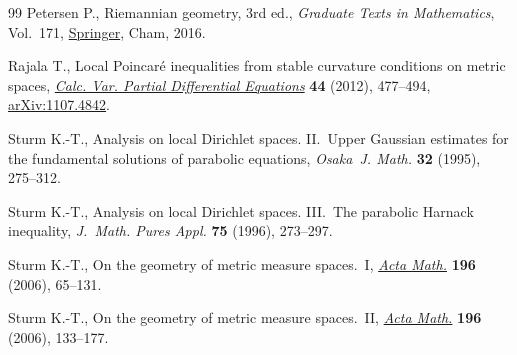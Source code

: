 \documentclass[pdftex]{sigma}
\numberwithin{equation}{section}
\theoremstyle{definition}
\begin{document}
\begin{thebibliography}{99}
Petersen P., Riemannian geometry, 3rd ed., \textit{Graduate Texts in Mathematics}, Vol.~171, \href{https://doi.org/10.1007/978-3-319-26654-1}{Springer}, Cham, 2016.

Rajala T., Local {P}oincar\'e inequalities from stable curvature conditions on
 metric spaces, \href{https://doi.org/10.1007/s00526-011-0442-7}{\textit{Calc. Var. Partial Differential Equations}} \textbf{44}
 (2012), 477--494, \href{https://arxiv.org/abs/1107.4842}{arXiv:1107.4842}.

Sturm K.-T., Analysis on local {D}irichlet spaces. {II}.~{U}pper {G}aussian
 estimates for the fundamental solutions of parabolic equations,
 \textit{Osaka~J. Math.} \textbf{32} (1995), 275--312.

Sturm K.-T., Analysis on local {D}irichlet spaces. {III}.~{T}he parabolic
 {H}arnack inequality, \textit{J.~Math. Pures Appl.} \textbf{75} (1996),
 273--297.

Sturm K.-T., On the geometry of metric measure spaces.~{I}, \href{https://doi.org/10.1007/s11511-006-0002-8}{\textit{Acta Math.}}
 \textbf{196} (2006), 65--131.

Sturm K.-T., On the geometry of metric measure spaces.~{II}, \href{https://doi.org/10.1007/s11511-006-0003-7}{\textit{Acta Math.}}
 \textbf{196} (2006), 133--177.

\end{thebibliography}\LastPageEnding
\end{document}
